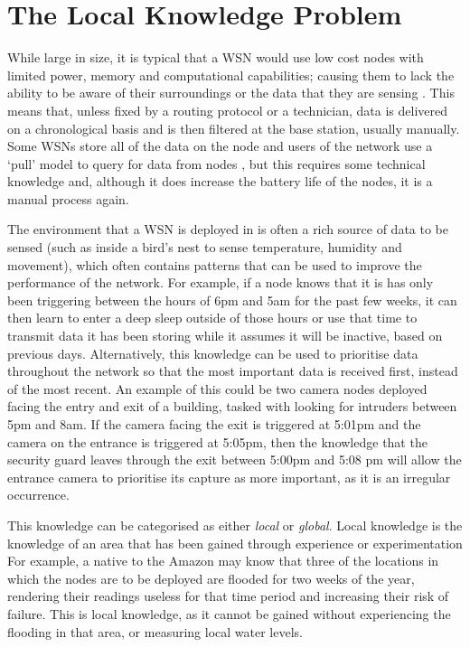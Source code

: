\section{The Local Knowledge Problem}
While large in size, it is typical that a WSN would use low cost nodes with limited power, memory and computational capabilities; causing them to lack the ability to be aware of their surroundings or the data that they are sensing \cite{Akyildiz2002}. This means that, unless fixed by a routing protocol or a technician, data is delivered on a chronological basis and is then filtered at the base station, usually manually. Some WSNs store all of the data on the node and users of the network use a `pull' model to query for data from nodes \cite{Sadagopan}, but this requires some technical knowledge and, although it does increase the battery life of the nodes, it is a manual process again.

The environment that a WSN is deployed in is often a rich source of data to be sensed (such as inside a bird's nest to sense temperature, humidity and movement), which often contains patterns that can be used to improve the performance of the network. For example, if a node knows that it is has only been triggering between the hours of 6pm and 5am for the past few weeks, it can then learn to enter a deep sleep outside of those hours or use that time to transmit data it has been storing while it assumes it will be inactive, based on previous days. Alternatively, this knowledge can be used to prioritise data throughout the network so that the most important data is received first, instead of the most recent. An example of this could be two camera nodes deployed facing the entry and exit of a building, tasked with looking for intruders between 5pm and 8am. If the camera facing the exit is triggered at 5:01pm and the camera on the entrance is triggered at 5:05pm, then the knowledge that the security guard leaves through the exit between 5:00pm and 5:08 pm will allow the entrance camera to prioritise its capture as more important, as it is an irregular occurrence.

This knowledge can be categorised as either \textit{local} or \textit{global}. Local knowledge is the knowledge of an area that has been gained through experience or experimentation \cite{Joshi2001} For example, a native to the Amazon may know that three of the locations in which the nodes are to be deployed are flooded for two weeks of the year, rendering their readings useless for that time period and increasing their risk of failure. This is local knowledge, as it cannot be gained without experiencing the flooding in that area, or measuring local water levels.

